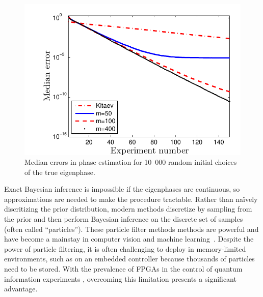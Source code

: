 \documentclass[aps,pra,amsmath,twocolumn,amssymb,superscriptaddress]{revtex4-1}
\begin{document}
\begin{figure}[t!]
    \begin{centering}
        \includegraphics[width=0.8\linewidth]{PEerror.pdf}
    \end{centering}
    \caption{\label{fig:PEerror}
     Median errors in phase estimation for 10~000 random initial choices of the true eigenphase.
    }
\end{figure}





Exact Bayesian inference is impossible if the eigenphases are
continuous, so approximations are needed to
make the procedure tractable.  Rather than na\"ively discritizing the prior
distribution, modern methods discretize by sampling from the prior and
then perform Bayesian inference on the discrete set of samples (often called
``particles'').  These particle filter methods methods are powerful and
have become a mainstay in computer vision and machine
learning~\cite{haykin2004kalman,smith2013sequential,isard_condensationconditional_1998}.
Despite the power of particle filtering, it is often challenging to deploy in memory-limited environments,
such as on an embedded controller because thousands of particles need to be stored. With the prevalence of FPGAs in the control of
quantum information experiments
\cite{shulman_suppressing_2014,casagrande_design_2014,hornibrook_cryogenic_2015},
overcoming this limitation presents a significant advantage.
\end{document}

